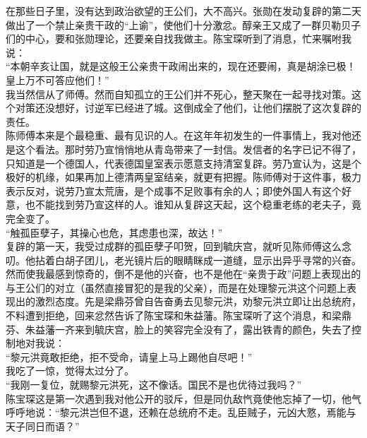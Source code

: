在那些日子里，没有达到政治欲望的王公们，大不高兴。张勋在发动复辟的第二天做出了一个禁止亲贵干政的“上谕”，使他们十分激忿。醇亲王又成了一群贝勒贝子们的中心，要和张勋理论，还要亲自找我做主。陈宝琛听到了消息，忙来嘱咐我说：\\

“本朝辛亥让国，就是这般王公亲贵干政闹出来的，现在还要闹，真是胡涂已极！皇上万不可答应他们！”\\

我当然信从了师傅。然而自知孤立的王公们并不死心，整天聚在一起寻找对策。这个对策还没想好，讨逆军已经进了城。这倒成全了他们，让他们摆脱了这次复辟的责任。\\

陈师傅本来是个最稳重、最有见识的人。在这年年初发生的一件事情上，我对他还是这个看法。那时劳乃宣悄悄地从青岛带来了一封信。发信者的名字已记不得了，只知道是一个德国人，代表德国皇室表示愿意支持清室复辟。劳乃宣认为，这是个极好的机缘，如果再加上德清两皇室结亲，就更有把握。陈师傅对于这件事，极力表示反对，说劳乃宣太荒唐，是个成事不足败事有余的人；即使外国人有这个好意，也不能找到劳乃宣这样的人。谁知从复辟这天起，这个稳重老练的老夫子，竟完全变了。\\

“触孤臣孽子，其操心也危，其虑患也深，故达！”\\

复辟的第一天，我受过成群的孤臣孽子叩贺，回到毓庆宫，就听见陈师傅这么念叨。他拈着白胡子团儿，老光镜片后的眼睛眯成一道缝，显示出异乎寻常的兴奋。\\

然而使我最感到惊奇的，倒不是他的兴奋，也不是他在“亲贵于政”问题上表现出的与王公们的对立（虽然直接冒犯的是我的父亲），而是在处理黎元洪这个问题上表现出的激烈态度。先是梁鼎芬曾自告奋勇去见黎元洪，劝黎元洪立即让出总统府，不料遭到拒绝，回来忿然告诉了陈宝琛和朱益藩。陈宝琛听了这个消息，和梁鼎芬、朱益藩一齐来到毓庆宫，脸上的笑容完全没有了，露出铁青的颜色，失去了控制地对我说：\\

“黎元洪竟敢拒绝，拒不受命，请皇上马上踢他自尽吧！”\\

我吃了一惊，觉得太过分了。\\

“我刚一复位，就赐黎元洪死，这不像话。国民不是也优待过我吗？”\\

陈宝琛这是第一次遇到我对他公开的驳斥，但是同仇敌忾竟使他忘掉了一切，他气呼呼地说：“黎元洪岂但不退，还赖在总统府不走。乱臣贼子，元凶大憝，焉能与天子同日而语？”\\

